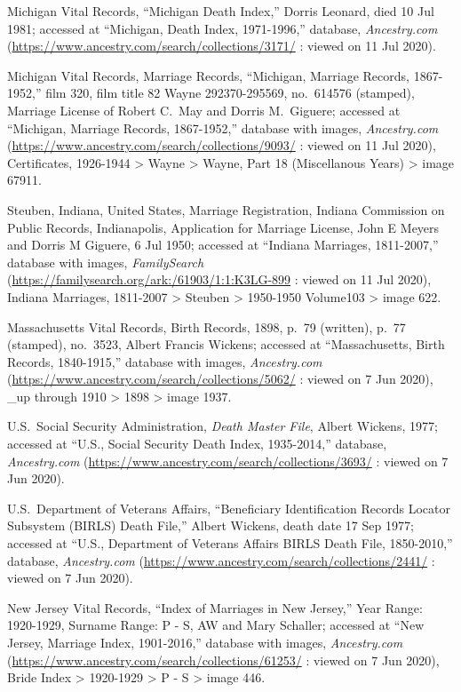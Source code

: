 \begin{thebibliography}{999}
	Michigan Vital Records, ``Michigan Death Index,'' Dorris Leonard, died 10 Jul 1981; accessed at ``Michigan, Death Index, 1971-1996,'' database, \textit{Ancestry.com} (\url{https://www.ancestry.com/search/collections/3171/} : viewed on 11 Jul 2020).
	
	Michigan Vital Records, Marriage Records, ``Michigan, Marriage Records, 1867-1952,'' film 320, film title 82 Wayne 292370-295569, no.\ 614576 (stamped), Marriage License of Robert C.\ May and Dorris M.\ Giguere; accessed at ``Michigan, Marriage Records, 1867-1952,'' database with images, \textit{Ancestry.com} (\url{https://www.ancestry.com/search/collections/9093/} : viewed on 11 Jul 2020), Certificates, 1926-1944 > Wayne > Wayne, Part 18 (Miscellanous Years) > image 67911.
	
	Steuben, Indiana, United States, Marriage Registration, Indiana Commission on Public Records, Indianapolis, Application for Marriage License, John E Meyers and Dorris M Giguere, 6 Jul 1950; accessed at ``Indiana Marriages, 1811-2007,'' database with images, \textit{FamilySearch} (\url{https://familysearch.org/ark:/61903/1:1:K3LG-899} : viewed on 11 Jul 2020), Indiana Marriages, 1811-2007 > Steuben > 1950-1950 Volume103 > image 622.
	
	Massachusetts Vital Records, Birth Records, 1898, p.\ 79 (written), p.\ 77 (stamped), no.\ 3523, Albert Francis Wickens; accessed at ``Massachusetts, Birth Records, 1840-1915,'' database with images, \textit{Ancestry.com} (\url{https://www.ancestry.com/search/collections/5062/} : viewed on 7 Jun 2020), \_up through 1910 > 1898 > image 1937.
	
	U.S.\ Social Security Administration, \textit{Death Master File}, Albert Wickens, 1977; accessed at ``U.S., Social Security Death Index, 1935-2014,'' database, \textit{Ancestry.com} (\url{https://www.ancestry.com/search/collections/3693/} : viewed on 7 Jun 2020).
	
	U.S.\ Department of Veterans Affairs, ``Beneficiary Identification Records Locator Subsystem (BIRLS) Death File,'' Albert Wickens, death date 17 Sep 1977; accessed at ``U.S., Department of Veterans Affairs BIRLS Death File, 1850-2010,'' database, \textit{Ancestry.com} (\url{https://www.ancestry.com/search/collections/2441/} : viewed on 7 Jun 2020).
	
	New Jersey Vital Records, ``Index of Marriages in New Jersey,'' Year Range: 1920-1929, Surname Range: P - S, AW and Mary Schaller; accessed at ``New Jersey, Marriage Index, 1901-2016,'' database with images, \textit{Ancestry.com} (\url{https://www.ancestry.com/search/collections/61253/} : viewed on 7 Jun 2020), Bride Index > 1920-1929 > P - S > image 446.
	

\end{thebibliography}

